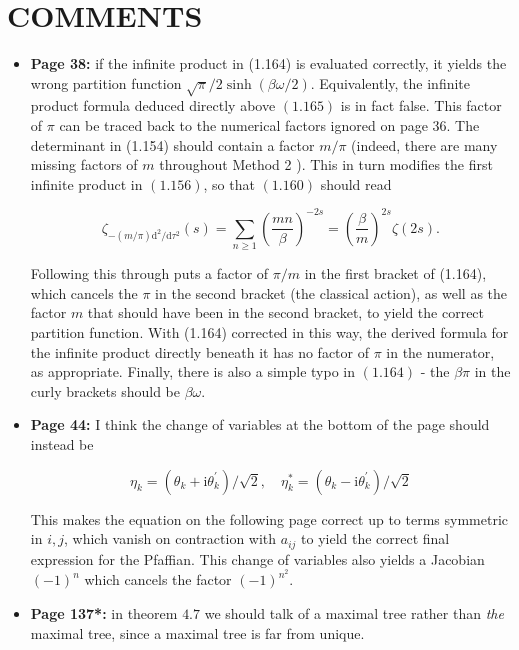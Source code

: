 \documentclass{article}
\begin{document}
\section*{COMMENTS}
\begin{itemize}
  
\item[] {\bf Page 38:} if the infinite product in (1.164) is evaluated correctly, it yields the wrong partition function $\sqrt{\pi} / 2 \sinh (\beta \omega / 2)$. Equivalently, the infinite product formula deduced directly above $(1.165)$ is in fact false. This factor of $\pi$ can be traced back to the numerical factors ignored on page 36. The determinant in (1.154) should contain a factor $m / \pi$ (indeed, there are many missing factors of $m$ throughout Method 2 ). This in turn modifies the first infinite product in $(1.156)$, so that $(1.160)$ should read

\[\zeta_{-(m/\pi)\mathrm{d}^2/\mathrm{d}\tau^2}(s) = \sum_{n \geq 1} \left(\frac{mn}{\beta}\right)^{-2s} = \left(\frac{\beta}{m}\right)^{2s}\zeta(2s).\]

Following this through puts a factor of $\pi / m$ in the first bracket of (1.164), which cancels the $\pi$ in the second bracket (the classical action), as well as the factor $m$ that should have been in the second bracket, to yield the correct partition function. With (1.164) corrected in this way, the derived formula for the infinite product directly beneath it has no factor of $\pi$ in the numerator, as appropriate. Finally, there is also a simple typo in $(1.164)$ - the $\beta \pi$ in the curly brackets should be $\beta \omega$.

\item[] {\bf  Page 44:} I think the change of variables at the bottom of the page should instead be

$$
\eta_{k}=\left(\theta_{k}+\mathrm{i} \theta_{k}^{\prime}\right) / \sqrt{2}, \quad \eta_{k}^{*}=\left(\theta_{k}-\mathrm{i} \theta_{k}^{\prime}\right) / \sqrt{2}
$$

This makes the equation on the following page correct up to terms symmetric in $i, j$, which vanish on contraction with $a_{i j}$ to yield the correct final expression for the Pfaffian. This change of variables also yields a Jacobian $(-1)^{n}$ which cancels the factor $(-1)^{n^{2}}$.

\item[] {\bf  Page 137*:} in theorem $4.7$ we should talk of a maximal tree rather than \emph{the} maximal tree, since a maximal tree is far from unique.


\end{itemize}
\end{document}
